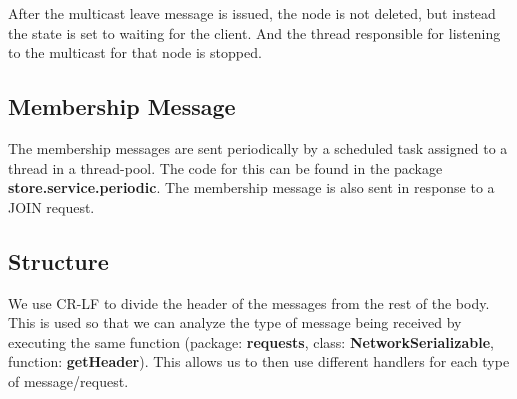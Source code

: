 After the multicast leave message is issued, the node is not deleted, but instead the state is set to waiting for the client. And the thread responsible for listening to the multicast for that node is stopped. 


\subsection{Membership Message}

The membership messages are sent periodically by a scheduled task assigned to a thread in a thread-pool. The code for this can be found in the package \textbf{store.service.periodic}. 
The membership message is also sent in response to a JOIN request.

\subsection{Structure}

We use CR-LF to divide the header of the messages from the rest of the body. This is used so that we can analyze the type of message being received by executing the same function (package: \textbf{requests}, class: \textbf{NetworkSerializable}, function: \textbf{getHeader}). This allows us to then use different handlers for each type of message/request.

